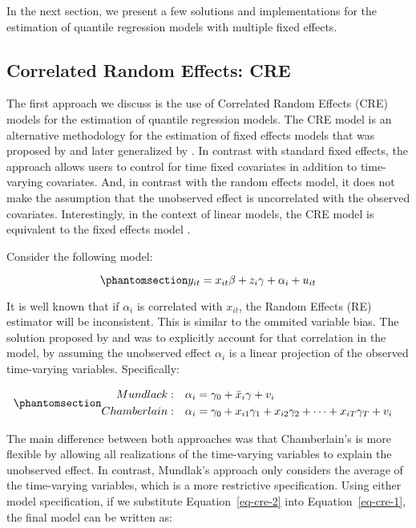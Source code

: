 \documentclass[bib]{statapress}
\begin{document}
In the next section, we present a few solutions and implementations for
the estimation of quantile regression models with multiple fixed
effects.

\subsection{Correlated Random Effects: CRE}\label{sec-cre}

The first approach we discuss is the use of Correlated Random Effects
(CRE) models for the estimation of quantile regression models. The CRE
model is an alternative methodology for the estimation of fixed effects
models that was proposed by \citet{mundlak1978} and later generalized by
\citet{chamberlain1982}. In contrast with standard fixed effects, the
approach allows users to control for time fixed covariates in addition
to time-varying covariates. And, in contrast with the random effects
model, it does not make the assumption that the unobserved effect is
uncorrelated with the observed covariates. Interestingly, in the context
of linear models, the CRE model is equivalent to the fixed effects model
\citep{wooldridge2010}.

Consider the following model:

\begin{equation}\phantomsection\label{eq-cre-1}{y_{it} = x_{it}\beta + z_{i}\gamma + \alpha_i + u_{it}
}\end{equation}

It is well known that if \(\alpha_i\) is correlated with \(x_{it}\), the
Random Effects (RE) estimator will be inconsistent. This is similar to
the ommited variable bias. The solution proposed by \citet{mundlak1978}
and \citet{chamberlain1982} was to explicitly account for that
correlation in the model, by assuming the unobserved effect \(\alpha_i\)
is a linear projection of the observed time-varying variables.
Specifically:

\begin{equation}\phantomsection\label{eq-cre-2}{\begin{aligned}
Mundlack:  & & \alpha_i &= \gamma_0 + \bar x_{i}\gamma + v_i&  \\
Chamberlain: & & \alpha_i &= \gamma_0 + x_{i1}\gamma_1 + x_{i2}\gamma_2 + \dots + x_{iT}\gamma_T + v_i 
\end{aligned}
}\end{equation}

The main difference between both approaches was that Chamberlain's is
more flexible by allowing all realizations of the time-varying variables
to explain the unobserved effect. In contrast, Mundlak's approach only
considers the average of the time-varying variables, which is a more
restrictive specification. Using either model specification, if we
substitute Equation~\ref{eq-cre-2} into Equation~\ref{eq-cre-1}, the
final model can be written as:
\end{document}
